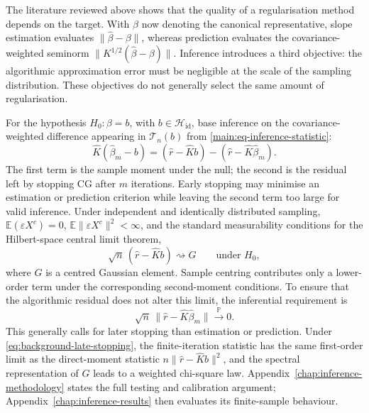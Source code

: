 The literature reviewed above shows that the quality of a regularisation method depends on the target. With $\beta$ now denoting the canonical representative, slope estimation evaluates $\|\widehat\beta-\beta\|$, whereas prediction evaluates the covariance-weighted seminorm $\|K^{1/2}(\widehat\beta-\beta)\|$. Inference introduces a third objective: the algorithmic approximation error must be negligible at the scale of the sampling distribution. These objectives do not generally select the same amount of regularisation.

For the hypothesis $H_0:\beta=b$, with
$b\in\mathcal H_{\mathrm{id}}$, \textcite{babii_carrasco_tsafack_2026} base inference on
the covariance-weighted difference appearing in
$\mathcal T_n(b)$ from \eqref{main:eq-inference-statistic}:
\begin{equation}
    \widehat K(\widehat\beta_m-b)
    =(\widehat r-\widehat Kb)
      -(\widehat r-\widehat K\widehat\beta_m).
    \label{eq:inference-residual-decomposition-background}
\end{equation}
The first term is the sample moment under the null; the second is the residual left by stopping CG after $m$ iterations. Early stopping may minimise an estimation or prediction criterion while leaving the second term too large for valid inference. Under independent and identically distributed sampling, $\mathbb E(\varepsilon X^c)=0$, $\mathbb E\|\varepsilon X^c\|^2<\infty$, and the standard measurability conditions for the Hilbert-space central limit theorem,
\begin{equation}
    \sqrt n\,(\widehat r-\widehat Kb)
    \rightsquigarrow G
    \qquad\text{under }H_0,
    \label{eq:background-moment-clt}
\end{equation}
where $G$ is a centred Gaussian element.  Sample centring contributes only a
lower-order term under the corresponding second-moment conditions.  To ensure
that the algorithmic residual does not alter this limit, the inferential
requirement is
\begin{equation}
    \sqrt n\,
    \|\widehat r-\widehat K\widehat\beta_m\|
    \xrightarrow{\mathbb P}0.
    \label{eq:background-late-stopping}
\end{equation}
This generally calls for later stopping than estimation or prediction.  Under
\eqref{eq:background-late-stopping}, the finite-iteration statistic has the same
first-order limit as the direct-moment statistic
$n\|\widehat r-\widehat Kb\|^2$, and the spectral representation of $G$ leads
to a weighted chi-square law.  Appendix~\ref{chap:inference-methodology} states
the full testing and calibration argument; Appendix~\ref{chap:inference-results}
then evaluates its finite-sample behaviour.

